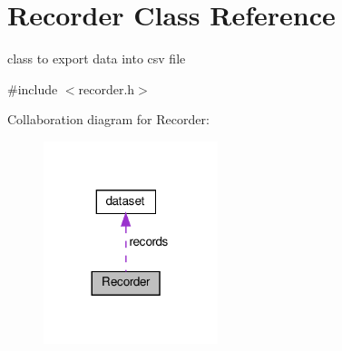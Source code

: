 \hypertarget{classRecorder}{}\section{Recorder Class Reference}
\label{classRecorder}


class to export data into csv file  




{\ttfamily \#include $<$recorder.\+h$>$}



Collaboration diagram for Recorder\+:
\nopagebreak
\begin{figure}[H]
\begin{center}
\leavevmode
\includegraphics[width=144pt]{classRecorder__coll__graph}
\end{center}
\end{figure}
